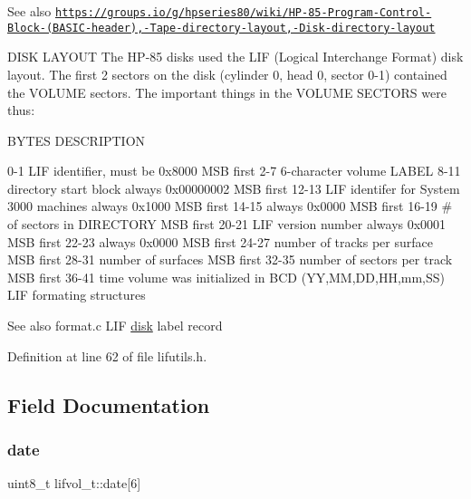 \begin{DoxySeeAlso}{See also}
\href{https://groups.io/g/hpseries80/wiki/HP-85-Program-Control-Block-(BASIC-header),-Tape-directory-layout,-Disk-directory-layout}{\tt https\+://groups.\+io/g/hpseries80/wiki/\+H\+P-\/85-\/\+Program-\/\+Control-\/\+Block-\/(\+B\+A\+S\+I\+C-\/header),-\/\+Tape-\/directory-\/layout,-\/\+Disk-\/directory-\/layout}
\end{DoxySeeAlso}
D\+I\+SK L\+A\+Y\+O\+UT The H\+P-\/85 disks used the L\+IF (Logical Interchange Format) disk layout. The first 2 sectors on the disk (cylinder 0, head 0, sector 0-\/1) contained the V\+O\+L\+U\+ME sectors. The important things in the V\+O\+L\+U\+ME S\+E\+C\+T\+O\+RS were thus\+:

B\+Y\+T\+ES D\+E\+S\+C\+R\+I\+P\+T\+I\+ON 

 0-\/1 L\+IF identifier, must be 0x8000 M\+SB first 2-\/7 6-\/character volume L\+A\+B\+EL 8-\/11 directory start block always 0x00000002 M\+SB first 12-\/13 L\+IF identifer for System 3000 machines always 0x1000 M\+SB first 14-\/15 always 0x0000 M\+SB first 16-\/19 \# of sectors in D\+I\+R\+E\+C\+T\+O\+RY M\+SB first 20-\/21 L\+IF version number always 0x0001 M\+SB first 22-\/23 always 0x0000 M\+SB first 24-\/27 number of tracks per surface M\+SB first 28-\/31 number of surfaces M\+SB first 32-\/35 number of sectors per track M\+SB first 36-\/41 time volume was initialized in B\+CD (YY,MM,DD,HH,mm,SS) L\+IF formating structures \begin{DoxySeeAlso}{See also}
format.\+c L\+IF \hyperlink{td02lif_8c_affcceda12b139f26819f4929be705eb1}{disk} label record 
\end{DoxySeeAlso}


Definition at line 62 of file lifutils.\+h.



\subsection{Field Documentation}
\mbox{\label{structlifvol__t_a41f630e7211326270dc6e72a55f94516}} 
\subsubsection{\texorpdfstring{date}{date}}
{\footnotesize\ttfamily uint8\+\_\+t lifvol\+\_\+t\+::date\mbox{[}6\mbox{]}}



